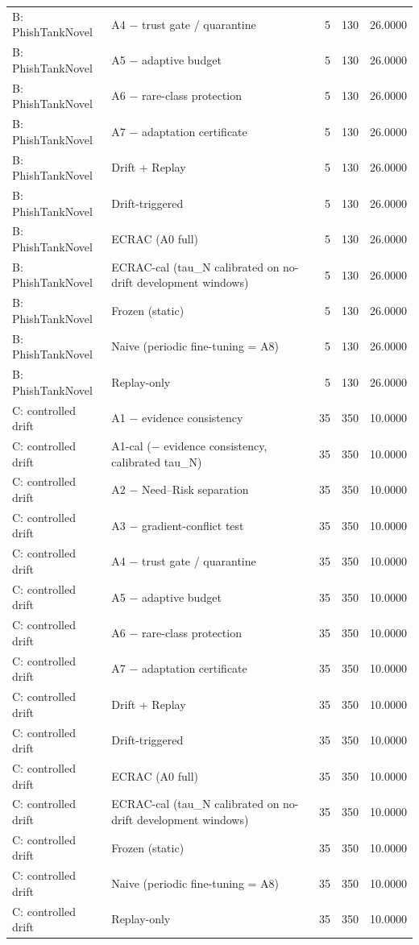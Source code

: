 \begin{table}[t]
\begin{tabular}{llrrr}
B: PhishTankNovel & A4 − trust gate / quarantine & 5 & 130 & 26.0000 \\
B: PhishTankNovel & A5 − adaptive budget & 5 & 130 & 26.0000 \\
B: PhishTankNovel & A6 − rare-class protection & 5 & 130 & 26.0000 \\
B: PhishTankNovel & A7 − adaptation certificate & 5 & 130 & 26.0000 \\
B: PhishTankNovel & Drift + Replay & 5 & 130 & 26.0000 \\
B: PhishTankNovel & Drift-triggered & 5 & 130 & 26.0000 \\
B: PhishTankNovel & ECRAC (A0 full) & 5 & 130 & 26.0000 \\
B: PhishTankNovel & ECRAC-cal (tau\_N calibrated on no-drift development windows) & 5 & 130 & 26.0000 \\
B: PhishTankNovel & Frozen (static) & 5 & 130 & 26.0000 \\
B: PhishTankNovel & Naive (periodic fine-tuning = A8) & 5 & 130 & 26.0000 \\
B: PhishTankNovel & Replay-only & 5 & 130 & 26.0000 \\
C: controlled drift & A1 − evidence consistency & 35 & 350 & 10.0000 \\
C: controlled drift & A1-cal (− evidence consistency, calibrated tau\_N) & 35 & 350 & 10.0000 \\
C: controlled drift & A2 − Need–Risk separation & 35 & 350 & 10.0000 \\
C: controlled drift & A3 − gradient-conflict test & 35 & 350 & 10.0000 \\
C: controlled drift & A4 − trust gate / quarantine & 35 & 350 & 10.0000 \\
C: controlled drift & A5 − adaptive budget & 35 & 350 & 10.0000 \\
C: controlled drift & A6 − rare-class protection & 35 & 350 & 10.0000 \\
C: controlled drift & A7 − adaptation certificate & 35 & 350 & 10.0000 \\
C: controlled drift & Drift + Replay & 35 & 350 & 10.0000 \\
C: controlled drift & Drift-triggered & 35 & 350 & 10.0000 \\
C: controlled drift & ECRAC (A0 full) & 35 & 350 & 10.0000 \\
C: controlled drift & ECRAC-cal (tau\_N calibrated on no-drift development windows) & 35 & 350 & 10.0000 \\
C: controlled drift & Frozen (static) & 35 & 350 & 10.0000 \\
C: controlled drift & Naive (periodic fine-tuning = A8) & 35 & 350 & 10.0000 \\
C: controlled drift & Replay-only & 35 & 350 & 10.0000 \\
\bottomrule
\end{tabular}
\end{table}